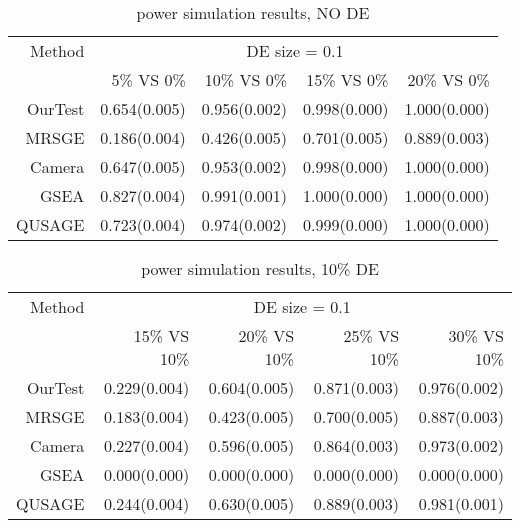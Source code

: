 \documentclass[11pt, a4paper]{article}
\begin{document}
		  		
	\begin{table}[ht]
		\centering
			\caption{power simulation results, NO DE}\label{table:power1}
		\begin{tabular}{rrrrr}
			\hline
		
		Method & \multicolumn{4}{c}{DE size = 0.1} \\
			\cline{2-5}
			& 5\% VS 0\% & 10\% VS 0\% & 15\% VS 0\% & 20\% VS 0\% \\ 
			\hline 
		OurTest & 0.654(0.005) & 0.956(0.002) & 0.998(0.000) & 1.000(0.000) \\ 
		MRSGE & 0.186(0.004) & 0.426(0.005) & 0.701(0.005) & 0.889(0.003) \\ 
		Camera & 0.647(0.005) & 0.953(0.002) & 0.998(0.000) & 1.000(0.000) \\ 
		GSEA & 0.827(0.004) & 0.991(0.001) & 1.000(0.000) & 1.000(0.000) \\ 
		QUSAGE & 0.723(0.004) & 0.974(0.002) & 0.999(0.000) & 1.000(0.000) \\ 
			\hline 
		\end{tabular}
	\end{table}
	
	
	\begin{table}[ht]
		\centering
	    \caption{power simulation results, 10\% DE }\label{table:power2}
		\begin{tabular}{rrrrr}
			\hline
		Method & \multicolumn{4}{c}{DE size = 0.1} \\
			\cline{2-5}
			& 15\% VS 10\% & 20\% VS 10\% & 25\% VS 10\% & 30\% VS 10\% \\ 
			\hline
	OurTest & 0.229(0.004) & 0.604(0.005) & 0.871(0.003) & 0.976(0.002) \\ 
	MRSGE & 0.183(0.004) & 0.423(0.005) & 0.700(0.005) & 0.887(0.003) \\ 
	Camera & 0.227(0.004) & 0.596(0.005) & 0.864(0.003) & 0.973(0.002) \\ 
	GSEA & 0.000(0.000) & 0.000(0.000) & 0.000(0.000) & 0.000(0.000) \\ 
	QUSAGE & 0.244(0.004) & 0.630(0.005) & 0.889(0.003) & 0.981(0.001) \\ 
		\hline
		\end{tabular}
	\end{table}
	
\end{document}
